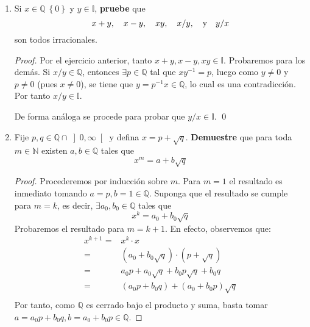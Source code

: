 \documentclass[12pt]{article}
\begin{document}
\begin{enumerate}
\begin{proof}
        De (IV): Si, tome $a=\frac{\sqrt{2}}{2}$ y $b=-\frac{\sqrt{2}}{2}$, entonces $a\cdot b=-\frac{1}{2}$ y $a+b=0$, siendo ambos números racionales.
        \qed
    \end{proof}
    \item Si $x\in\mathbb{Q}\ \left\{0\right\}$ y $y\in\mathbb{I}$, \textbf{pruebe} que
    \begin{equation*}
        x+y, \quad x-y, \quad xy, \quad x/y, \quad \textup{y} \quad y/x
    \end{equation*}
    son todos irracionales.
    \begin{proof}
        Por el ejercicio anterior, tanto $x+y,x-y,xy\in\mathbb{I}$. Probaremos para los demás. Si $x/y\in\mathbb{Q}$, entonces $\exists p\in\mathbb{Q}$ tal que $xy^{-1}=p$, luego como $y\neq 0$ y $p\neq0$ (pues $x\neq 0$), se tiene que $y=p^{-1}x\in\mathbb{Q}$, lo cual es una contradicción. Por tanto $x/y\in\mathbb{I}$.
        
        De forma análoga se procede para probar que $y/x\in\mathbb{I}$.
        \qed
    \end{proof}
    \item Fije $p,q\in\mathbb{Q}\cap \left]0,\infty\right[$ y defina $x=p+\sqrt{q}$. \textbf{Demuestre} que para toda $m\in\mathbb{N}$ existen $a,b\in\mathbb{Q}$ tales que
    \begin{equation*}
        x^m=a+b\sqrt{q}
    \end{equation*}
    \begin{proof}
        Procederemos por inducción sobre $m$. Para $m=1$ el resultado es inmediato tomando $a=p,b=1\in\mathbb{Q}$. Suponga que el resultado se cumple para $m=k$, es decir, $\exists a_0,b_0\in\mathbb{Q}$ tales que
        \begin{equation*}
            x^k=a_0+b_0\sqrt{q}
        \end{equation*}
        Probaremos el resultado para $m=k+1$. En efecto, observemos que:
        \begin{equation*}
            \begin{split}
                x^{k+1}=&x^k\cdot x\\
                =&\left(a_0+b_0\sqrt{q}\right)\cdot (p+\sqrt{q})\\
                =&a_0p+a_0\sqrt{q}+b_0p\sqrt{q}+b_0q\\
                =&\left(a_0p+b_0q\right)+\left(a_0+b_0p\right)\sqrt{q}\\
            \end{split}
        \end{equation*}
        Por tanto, como $\mathbb{Q}$ es cerrado bajo el producto y suma, basta tomar $a=a_0p+b_0q,b=a_0+b_0p\in\mathbb{Q}$.
        

\end{proof}
\end{enumerate}
\end{document}
